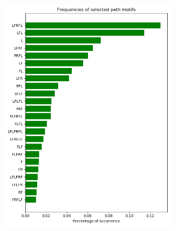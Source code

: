 \documentclass{article}
\begin{document}
\begin{figure}[!htp]
{\begin{subfigure}[b]{0.4\textwidth}
            \includegraphics[width=\textwidth]{path-1}
            \caption{}
            \label{fig:path1}
        \end{subfigure}
        \begin{subfigure}[b]{0.15\textwidth}
            \centering

\end{subfigure}}
\end{figure}
\end{document}

